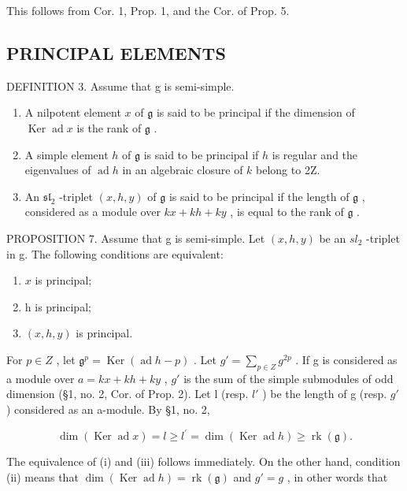 This follows from Cor. 1, Prop. 1, and the Cor. of Prop. 5.

\subsection{PRINCIPAL ELEMENTS}

DEFINITION 3. Assume that g is semi-simple.

\begin{enumerate}
\def\labelenumi{(\roman{enumi})}
\item
  A nilpotent element \(x\) of \(\mathfrak{g}\) is said to be principal if the dimension of \(\operatorname{Ker} \operatorname{ad} x\) is the rank of \(\mathfrak{g}\) .
\item
  A simple element \(h\) of \(\mathfrak{g}\) is said to be principal if \(h\) is regular and the eigenvalues of \(\operatorname{ad} h\) in an algebraic closure of \(k\) belong to 2Z.
\item
  An \(\mathfrak{sl}_2\) -triplet \((x,h,y)\) of \(\mathfrak{g}\) is said to be principal if the length of \(\mathfrak{g}\) , considered as a module over \(kx + kh + ky\) , is equal to the rank of \(\mathfrak{g}\) .
\end{enumerate}

PROPOSITION 7. Assume that g is semi-simple. Let \((x,h,y)\) be an \(sl_{2}\) -triplet in g. The following conditions are equivalent:

\begin{enumerate}
\def\labelenumi{(\roman{enumi})}
\item
  \(x\) is principal;
\item
  h is principal;
\item
  \((x,h,y)\) is principal.
\end{enumerate}

For \(p \in Z\) , let \(\mathfrak{g}^{p} = \operatorname{Ker}(\operatorname{ad} h - p)\) . Let \(g' = \sum_{p \in Z} g^{2p}\) . If g is considered as a module over \(a = kx + kh + ky\) , \(g'\) is the sum of the simple submodules of odd dimension (§1, no. 2, Cor. of Prop. 2). Let l (resp. \(l'\) ) be the length of g (resp. \(g'\) ) considered as an a-module. By §1, no. 2,

\[
\dim (\operatorname{Ker} \operatorname{ad} x) = l \geq l ^ {\prime} = \dim (\operatorname{Ker} \operatorname{ad} h) \geq \operatorname{rk} (\mathfrak {g}).
\]

The equivalence of (i) and (iii) follows immediately. On the other hand, condition (ii) means that \(\dim(\operatorname{Ker} \operatorname{ad} h) = \operatorname{rk}(\mathfrak{g})\) and \(g' = g\) , in other words that

